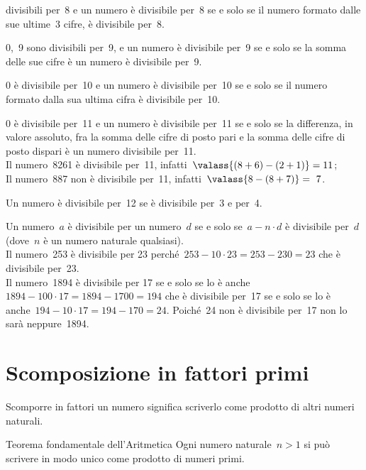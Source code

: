 \begin{description} [noitemsep]
divisibili per~8 
e un numero è divisibile per~8 se e solo se il numero formato dalle sue 
ultime~3 cifre, è divisibile per~8.
\item[\textbf{9}:~] 0,~9 sono divisibili per~9,
e un numero è divisibile per~9 se e solo se la somma delle sue cifre è un 
numero è divisibile per~9.
\item[\textbf{10}:~] 0 è divisibile per~10 
e un numero è divisibile per~10 se e solo se il numero formato dalla sua 
ultima cifra è divisibile per~10.
\item[\textbf{11}:~] 0 è divisibile per~11
e un numero è divisibile per~11 se e solo se la differenza, 
in valore assoluto, fra la somma delle cifre di posto pari e la somma delle 
cifre di posto dispari è un numero divisibile per~11.\\
Il numero~8261 è divisibile per~11, 
infatti~\(\valass{(8+6)-(2+1)} = 11\);\\
Il numero~887 non è divisibile per~11, infatti~\(\valass{8-(8+7)}=~7\).
\item[\textbf{12}:~] Un numero è divisibile per~12 se è 
divisibile per~3 e per~4.
\item[\textbf{un numero qualunque}:~] Un numero~\(a\) è divisibile 
per un numero~\(d\) se e solo se~\(a - n \cdot d\) è divisibile per~\(d\) 
(dove~\(n\) è un numero naturale qualsiasi).\\
Il numero~253 è divisibile per 23 
perché~\(253 - 10 \cdot 23 = 253 - 230 = 23\) che è divisibile per~23.\\
Il numero~1894 è divisibile per 17 se e solo se lo è 
anche~\(1894 - 100 \cdot 17 = 1894 - 1700 = 194\) 
che è divisibile per~17 se e solo se lo è
anche~\(194 - 10 \cdot 17 = 194 - 170 = 24\). 
Poiché~24 non è divisibile per~17 non lo sarà neppure~1894.
\end{description}



\section{Scomposizione in fattori primi}
\label{sec:nat_scomposizione}

Scomporre in fattori un numero significa scriverlo come prodotto di altri 
numeri naturali. 


\begin{teorema}{Teorema fondamentale dell'Aritmetica}{}
Ogni numero naturale~\(n>1\) si può scrivere in modo unico come prodotto 
di numeri primi.
\end{teorema}

